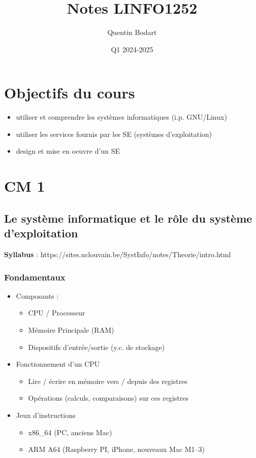 \documentclass{article}
\title{Notes LINFO1252}
\author{Quentin Bodart}
\date{Q1 2024-2025}
\begin{document}
\maketitle
\tableofcontents
\pagebreak

\section*{Objectifs du cours}
    \begin{itemize}
        \item utiliser et comprendre les systèmes informatiques (i.p. GNU/Linux)
        \item utiliser les services fournis par les SE (systèmes d'exploitation)
        \item design et mise en oeuvre d'un SE
    \end{itemize}

\section{CM 1}
    \subsection{Le système informatique et le rôle du système d’exploitation}
    \textbf{Syllabus} : https://sites.uclouvain.be/SystInfo/notes/Theorie/intro.html

        \subsubsection{Fondamentaux}
            \begin{itemize}
                \item Composants :
                \begin{itemize}
                    \item CPU / Processeur
                    \item Mémoire Principale (RAM)
                    \item Dispositifs d’entrée/sortie (y.c. de stockage)
                \end{itemize}
                \item Fonctionnement d'un CPU
                \begin{itemize}
                    \item Lire / écrire en mémoire vers / depuis des registres
                    \item Opérations (calculs, comparaisons) sur ces registres
                \end{itemize}
                \item Jeux d'instructions
                \begin{itemize}
                    \item x86\_64 (PC, anciens Mac)
                    \item ARM A64 (Raspberry PI, iPhone, nouveaux Mac M1–3)
                \end{itemize}
            \end{itemize}
        
\end{document}
